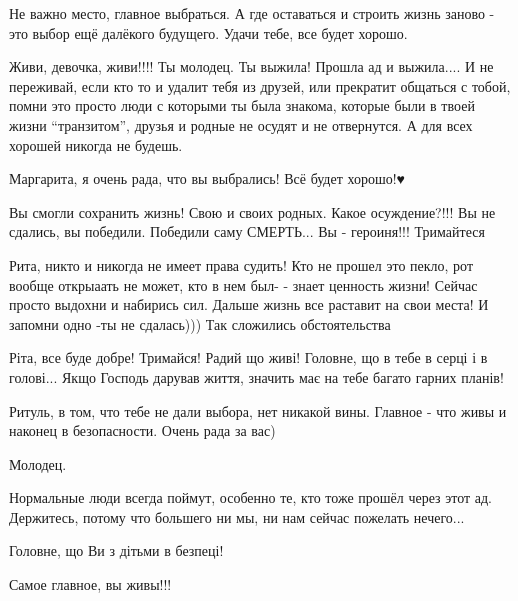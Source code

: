 
Не важно место, главное выбраться. А где оставаться и строить жизнь заново -
это выбор ещё далёкого будущего. Удачи тебе, все будет хорошо.


Живи, девочка, живи!!!! Ты молодец. Ты выжила! Прошла ад и выжила.... И не
переживай, если кто то и удалит тебя из друзей, или прекратит общаться с тобой,
помни это просто люди с которыми ты была знакома, которые были в твоей жизни
\enquote{транзитом}, друзья и родные не осудят и не отвернутся. А для всех хорошей
никогда не будешь.


Маргарита, я очень рада, что вы выбрались! Всё будет хорошо!♥️


Вы смогли сохранить жизнь! Свою и своих родных. Какое осуждение?!!! Вы не
сдались, вы победили. Победили саму СМЕРТЬ... Вы - героиня!!! Тримайтеся 💪💪💪


Рита, никто и никогда не имеет права судить! Кто не прошел это пекло, рот
вообще открыаать не может, кто в нем был- - знает ценность жизни! Сейчас просто
выдохни и набирись сил. Дальше жизнь все раставит на свои места! И запомни одно
-ты не сдалась))) Так сложились обстоятельства


Ріта, все буде добре! Тримайся! Радий що живі! Головне, що в тебе в серці і в
голові... Якщо Господь дарував життя, значить має на тебе багато гарних планів!


Ритуль, в том, что тебе не дали выбора, нет никакой вины. Главное - что живы и
наконец в безопасности. Очень рада за вас)


Молодец.


Нормальные люди всегда поймут, особенно те, кто тоже прошёл через этот ад.
Держитесь, потому что большего ни мы, ни нам сейчас пожелать нечего...


Головне, що Ви з дітьми в безпеці! 🙏


Самое главное, вы живы!!! 🙏🙏🙏

